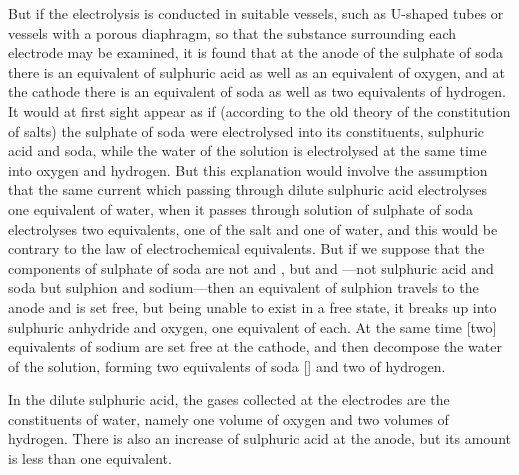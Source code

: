 \documentclass[12pt,oneside]{book}[2021/10/04]
\newcommand{\¬}{\hphantom{0}}
\begin{document}
But if the electrolysis is conducted in suitable vessels, such as
U-shaped tubes or vessels with a porous diaphragm, so that the
substance surrounding each electrode may be examined, it is found
that at the anode of the sulphate of soda there is an equivalent
of sulphuric acid as well as an equivalent of oxygen, and at
the cathode there is an equivalent of soda as well as two equivalents
of hydrogen. It would at first sight appear as if (according to the
old theory of the constitution of salts) the sulphate of soda were
electrolysed into its constituents, sulphuric acid and soda, while the
water of the solution is electrolysed at the same time into oxygen
and hydrogen. But this explanation would involve the assumption
that the same current which passing through dilute sulphuric acid
electrolyses one equivalent of water, when it passes through solution
of sulphate of soda electrolyses two equivalents, one of the
salt and one of water, and this would be contrary to the law of
electrochemical equivalents. But if we suppose that the components
of sulphate of soda are not  and , but  and ---not
sulphuric acid and soda but sulphion and sodium---then an
equivalent of sulphion travels to the anode and is set free, but being
unable to exist in a free state, it breaks up into sulphuric anhydride
and oxygen, one equivalent of each. At the same time [two] equivalents
of sodium are set free at the cathode, and then decompose the
water of the solution, forming two equivalents of soda []
and two of hydrogen.

In the dilute sulphuric acid, the gases collected at the electrodes
are the constituents of water, namely one volume of oxygen
and two volumes of hydrogen. There is also an increase
of sulphuric acid at the anode, but its amount is less than one
equivalent.
\end{document}
